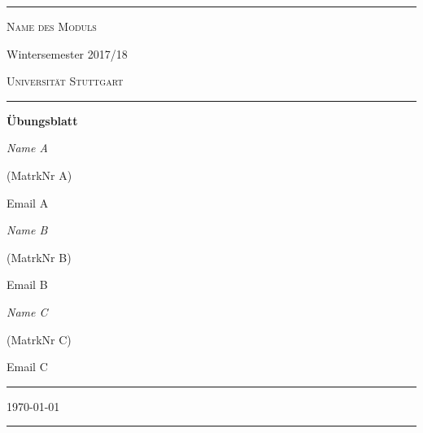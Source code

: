 \documentclass[12pt]{article} %
\newcounter{sheetnr}
\newcommand{\namei}{Name A} %
\newcommand{\matrknri}{MatrkNr A} %
\newcommand{\emaili}{Email A} %
\newcommand{\nameii}{Name B} %
\newcommand{\matrknrii}{MatrkNr B} %
\newcommand{\emailii}{Email B} %
\newcommand{\nameiii}{Name C} %
\newcommand{\matrknriii}{MatrkNr C} %
\newcommand{\emailiii}{Email C} %
\begin{document}


\begin{titlepage}
	\centering
	\rule{12cm}{1.0pt} %
	{\scshape\LARGE Name des Moduls \par}
	
	\vspace{0.5cm} %
	
	{\Large Wintersemester 2017/18}
	
	\vspace{1.5cm} %
	
	{\scshape\Large Universität Stuttgart\par}
	
	\vspace{1.0cm} %
	
	\rule{8cm}{0.6pt} %
	
	{\huge\bfseries Übungsblatt \thesheetnr \par}
	
	\vspace{2cm} %
	
	{\Large\itshape \namei} %
	{\Large (\matrknri)\par} %
	{\large \emaili \par} %
	
	\vspace{0.5cm} %
	
	{\Large\itshape \nameii} %
	{\Large (\matrknrii)\par} %
	{\large \emailii \par} %
	
	\vspace{0.5cm} %
	
	{\Large\itshape \nameiii} %
	{\Large (\matrknriii)\par} %
	{\large \emailiii \par} %
	
	\vspace{0.5cm} %
	
	\rule{8cm}{0.6pt} %
	
	\vspace{2cm} %
	
	{\Large \today\par} %
	
	\rule{12cm}{1.0pt} %
	
\end{titlepage}
\end{document}
